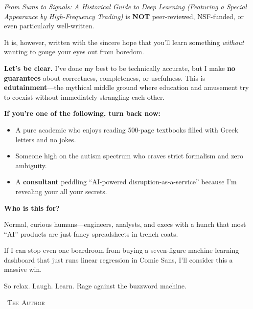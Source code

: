 \begin{tcolorbox}[
    enhanced,
    breakable,
    colback=white,
    colframe=red!70!black,
    coltitle=black,
    boxrule=1pt,
    arc=2mm,
    left=8mm,
    right=8mm,
    top=5mm,
    bottom=5mm,
    sharp corners=south,
    fonttitle=\LARGE\bfseries\sffamily,
    fontupper=\large\sffamily,
    title=\faExclamationTriangle\quad DISCLAIMER: PROCEED WITH CAUTION (AND MAYBE POPCORN)
  ]
  
  \vspace{0.5em}
  
  \textit{From Sums to Signals: A Historical Guide to Deep Learning (Featuring a Special Appearance by High-Frequency Trading)} is \textbf{NOT} peer-reviewed, NSF-funded, or even particularly well-written.

\medskip
  
  It is, however, written with the sincere hope that you’ll learn something \textit{without} wanting to gouge your eyes out from boredom.

\medskip
  
  
  \textbf{\large Let’s be clear.} I’ve done my best to be technically accurate, but I make \textbf{no guarantees} about correctness, completeness, or usefulness.  This is \textbf{edutainment}—the mythical middle ground where education and amusement try to coexist without immediately strangling each other.

\medskip
  
  \textbf{\large If you're one of the following, turn back now:}
  
  \begin{itemize}
    \item A pure academic who enjoys reading 500-page textbooks filled with Greek letters and no jokes.
    \item Someone high on the autism spectrum who craves strict formalism and zero ambiguity.
    \item A \textbf{consultant} peddling ``AI-powered disruption-as-a-service'' because I'm revealing your all your secrets.
  \end{itemize}

\medskip
  
  
  \textbf{\large Who is this for?}

\medskip
  
  Normal, curious humans—engineers, analysts, and execs with a hunch that most “AI” products are just fancy spreadsheets in trench coats.

\medskip
  
  If I can stop even one boardroom from buying a seven-figure machine learning dashboard that just runs linear regression in Comic Sans, I’ll consider this a massive win.

\medskip
  
  So relax. Laugh. Learn. Rage against the buzzword machine.
  
  \bigskip
  
  \hfill\textemdash\ \textsc{The Author}
  
  \end{tcolorbox}
  